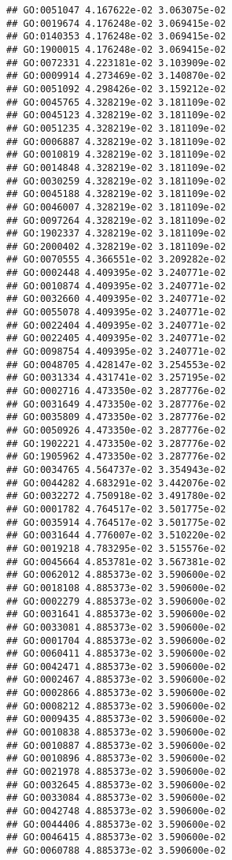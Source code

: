 \documentclass[
]{article}
\begin{document}
\begin{verbatim}
## GO:0051047 4.167622e-02 3.063075e-02
## GO:0019674 4.176248e-02 3.069415e-02
## GO:0140353 4.176248e-02 3.069415e-02
## GO:1900015 4.176248e-02 3.069415e-02
## GO:0072331 4.223181e-02 3.103909e-02
## GO:0009914 4.273469e-02 3.140870e-02
## GO:0051092 4.298426e-02 3.159212e-02
## GO:0045765 4.328219e-02 3.181109e-02
## GO:0045123 4.328219e-02 3.181109e-02
## GO:0051235 4.328219e-02 3.181109e-02
## GO:0006887 4.328219e-02 3.181109e-02
## GO:0010819 4.328219e-02 3.181109e-02
## GO:0014848 4.328219e-02 3.181109e-02
## GO:0030259 4.328219e-02 3.181109e-02
## GO:0045188 4.328219e-02 3.181109e-02
## GO:0046007 4.328219e-02 3.181109e-02
## GO:0097264 4.328219e-02 3.181109e-02
## GO:1902337 4.328219e-02 3.181109e-02
## GO:2000402 4.328219e-02 3.181109e-02
## GO:0070555 4.366551e-02 3.209282e-02
## GO:0002448 4.409395e-02 3.240771e-02
## GO:0010874 4.409395e-02 3.240771e-02
## GO:0032660 4.409395e-02 3.240771e-02
## GO:0055078 4.409395e-02 3.240771e-02
## GO:0022404 4.409395e-02 3.240771e-02
## GO:0022405 4.409395e-02 3.240771e-02
## GO:0098754 4.409395e-02 3.240771e-02
## GO:0048705 4.428147e-02 3.254553e-02
## GO:0031334 4.431741e-02 3.257195e-02
## GO:0002716 4.473350e-02 3.287776e-02
## GO:0031649 4.473350e-02 3.287776e-02
## GO:0035809 4.473350e-02 3.287776e-02
## GO:0050926 4.473350e-02 3.287776e-02
## GO:1902221 4.473350e-02 3.287776e-02
## GO:1905962 4.473350e-02 3.287776e-02
## GO:0034765 4.564737e-02 3.354943e-02
## GO:0044282 4.683291e-02 3.442076e-02
## GO:0032272 4.750918e-02 3.491780e-02
## GO:0001782 4.764517e-02 3.501775e-02
## GO:0035914 4.764517e-02 3.501775e-02
## GO:0031644 4.776007e-02 3.510220e-02
## GO:0019218 4.783295e-02 3.515576e-02
## GO:0045664 4.853781e-02 3.567381e-02
## GO:0062012 4.885373e-02 3.590600e-02
## GO:0018108 4.885373e-02 3.590600e-02
## GO:0002279 4.885373e-02 3.590600e-02
## GO:0031641 4.885373e-02 3.590600e-02
## GO:0033081 4.885373e-02 3.590600e-02
## GO:0001704 4.885373e-02 3.590600e-02
## GO:0060411 4.885373e-02 3.590600e-02
## GO:0042471 4.885373e-02 3.590600e-02
## GO:0002467 4.885373e-02 3.590600e-02
## GO:0002866 4.885373e-02 3.590600e-02
## GO:0008212 4.885373e-02 3.590600e-02
## GO:0009435 4.885373e-02 3.590600e-02
## GO:0010838 4.885373e-02 3.590600e-02
## GO:0010887 4.885373e-02 3.590600e-02
## GO:0010896 4.885373e-02 3.590600e-02
## GO:0021978 4.885373e-02 3.590600e-02
## GO:0032645 4.885373e-02 3.590600e-02
## GO:0033084 4.885373e-02 3.590600e-02
## GO:0042748 4.885373e-02 3.590600e-02
## GO:0044406 4.885373e-02 3.590600e-02
## GO:0046415 4.885373e-02 3.590600e-02
## GO:0060788 4.885373e-02 3.590600e-02

\end{verbatim}
\end{document}
